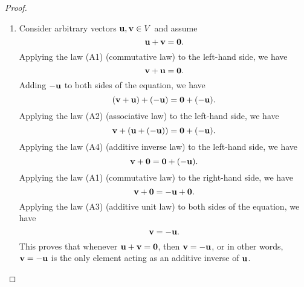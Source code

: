 \begin{proof}
\begin{enumialphparenastyle}
\begin{enumerate}
    \item Consider arbitrary vectors $\mbox{\bf u},\mbox{\bf v}\in V$ and assume
      \begin{equation*}
        \mbox{\bf u}+\mbox{\bf v}=\mbox{\bf 0}.
      \end{equation*}
      Applying the law (A1) (commutative law) to the left-hand side, we
      have
      \begin{equation*}
        \mbox{\bf v}+\mbox{\bf u}=\mbox{\bf 0}.
      \end{equation*}
      Adding $-\mbox{\bf u}$ to both sides of the equation, we have
      \begin{equation*}
        (\mbox{\bf v}+\mbox{\bf u})+(-\mbox{\bf u}) = \mbox{\bf 0}+(-\mbox{\bf u}).
      \end{equation*}
      Applying the law (A2) (associative law) to the left-hand side, we
      have
      \begin{equation*}
        \mbox{\bf v}+(\mbox{\bf u}+(-\mbox{\bf u})) = \mbox{\bf 0}+(-\mbox{\bf u}).
      \end{equation*}
      Applying the law (A4) (additive inverse law) to the left-hand
      side, we have
      \begin{equation*}
        \mbox{\bf v}+\mbox{\bf 0} = \mbox{\bf 0}+(-\mbox{\bf u}).
      \end{equation*}
      Applying the law (A1) (commutative law) to the right-hand side, we
      have
      \begin{equation*}
        \mbox{\bf v}+\mbox{\bf 0} = -\mbox{\bf u} + \mbox{\bf 0}.
      \end{equation*}
      Applying the law (A3) (additive unit law) to both sides of the
      equation, we have
      \begin{equation*}
        \mbox{\bf v} = -\mbox{\bf u}.
      \end{equation*}
      This proves that whenever $\mbox{\bf u}+\mbox{\bf v}=\mbox{\bf 0}$, then
      $\mbox{\bf v} = -\mbox{\bf u}$, or in other words, $\mbox{\bf v} = -\mbox{\bf u}$
      is the only element acting as an additive inverse of $\mbox{\bf u}$.


\end{enumerate}
\end{enumialphparenastyle}
\end{proof}
